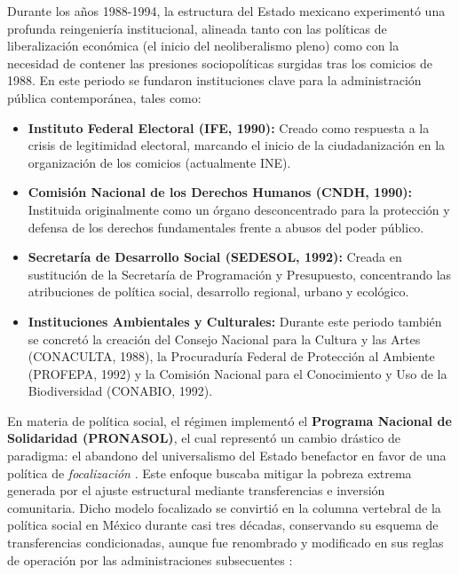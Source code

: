Durante los años 1988-1994, la estructura del Estado mexicano experimentó una profunda reingeniería institucional, alineada tanto con las políticas de liberalización 
económica (el inicio del neoliberalismo pleno) como con la necesidad de contener las presiones sociopolíticas surgidas tras los comicios de 1988. 
En este periodo se fundaron instituciones clave para la administración pública contemporánea, tales como:

\begin{itemize}
    \item \textbf{Instituto Federal Electoral (IFE, 1990):} Creado como respuesta a la crisis de legitimidad electoral, marcando el inicio de la ciudadanización en la 
            organización de los comicios (actualmente INE).
    \item \textbf{Comisión Nacional de los Derechos Humanos (CNDH, 1990):} Instituida originalmente como un órgano desconcentrado para la protección y defensa de los 
            derechos fundamentales frente a abusos del poder público.
    \item \textbf{Secretaría de Desarrollo Social (SEDESOL, 1992):} Creada en sustitución de la Secretaría de Programación y Presupuesto, concentrando las 
            atribuciones de política social, desarrollo regional, urbano y ecológico.
    \item \textbf{Instituciones Ambientales y Culturales:} Durante este periodo también se concretó la creación del Consejo Nacional para la Cultura y las Artes 
            (CONACULTA, 1988), la Procuraduría Federal de Protección al Ambiente (PROFEPA, 1992) y la Comisión Nacional para el Conocimiento y Uso de la 
            Biodiversidad (CONABIO, 1992).
\end{itemize}

En materia de política social, el régimen implementó el \textbf{Programa Nacional de Solidaridad (PRONASOL)}, el cual representó un cambio drástico de paradigma: 
el abandono del universalismo del Estado benefactor en favor de una política de \textit{focalización} \cite{barba2004paradigma}. 
Este enfoque buscaba mitigar la pobreza extrema generada por el ajuste estructural mediante transferencias e inversión comunitaria. Dicho modelo focalizado se convirtió 
en la columna vertebral de la política social en México durante casi tres décadas, conservando su esquema de transferencias condicionadas, aunque fue renombrado y 
modificado en sus reglas de operación por las administraciones subsecuentes \cite{gordon1999pobreza}:

